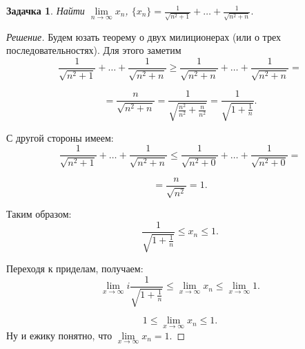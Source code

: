 \documentclass[a4paper,12pt]{article}
\newtheorem*{task}{Задачка}
\begin{document}
    \begin{task} %
        Найти $\lim\limits_{n \to \infty} x_n$, $\{x_n\} = \frac{1}{\sqrt{n^2 + 1}} +  \ldots + \frac{1}{\sqrt{n^2 + n}}. $
    \end{task}
    \begin{proof}[Решение]
        Будем юзать теорему о двух милиционерах (или о трех последовательностях). Для этого заметим
        $$ \frac{1}{\sqrt{n^2 + 1}} +  \ldots + \frac{1}{\sqrt{n^2 + n}} \geq 
           \frac{1}{\sqrt{n^2 + n}} +  \ldots + \frac{1}{\sqrt{n^2 + n}} = $$

        $$ = \frac{n}{\sqrt{n^2 + n}} = \frac{1}{\sqrt{\frac{n^2}{n^2} + \frac{n}{n^2}}} = \frac{1}{\sqrt{1 + \frac{1}{n}}}.$$

        С другой стороны имеем:
        $$ \frac{1}{\sqrt{n^2 + 1}} +  \ldots + \frac{1}{\sqrt{n^2 + n}} \leq 
           \frac{1}{\sqrt{n^2 + 0}} +  \ldots + \frac{1}{\sqrt{n^2 + 0}} = $$

        $$ = \frac{n}{\sqrt{n^2}} = 1.$$

        Таким образом:
        $$\frac{1}{\sqrt{1 + \frac{1}{n}}} \leq x_n \leq 1.$$

        Переходя к приделам, получаем:
            $$\lim\limits_{x \to \infty}i\frac{1}{\sqrt{1 + \frac{1}{n}}} \leq \lim\limits_{x \to \infty}x_n \leq \lim\limits_{x \to \infty}1.$$

            $$1\leq \lim\limits_{x \to \infty}x_n \leq 1.$$
        Ну и ежику понятно, что $\lim\limits_{x \to \infty}x_n = 1$.
    \end{proof}
\end{document}
